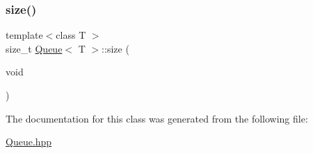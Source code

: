 \mbox{\label{class_queue_ae8744e96ba805136b01a96f9ac93f982}} 
\subsubsection{\texorpdfstring{size()}{size()}}
{\footnotesize\ttfamily template$<$class T $>$ \\
size\+\_\+t \hyperlink{class_queue}{Queue}$<$ T $>$\+::size (\begin{DoxyParamCaption}\item[{void}]{ }\end{DoxyParamCaption})}



The documentation for this class was generated from the following file\+:\begin{DoxyCompactItemize}
\item 
\hyperlink{_queue_8hpp}{Queue.\+hpp}\end{DoxyCompactItemize}
